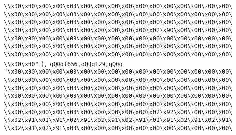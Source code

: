 \verb|\\x00\x00\x00\x00\x00\x00\x00\x00\x00\x00\x00\x00\x00\x00\x00\x00\|\newline
\verb|\\x00\x00\x00\x00\x00\x00\x00\x00\x00\x00\x00\x00\x00\x00\x00\x00\|\newline
\verb|\\x00\x00\x00\x00\x00\x00\x00\x00\x00\x00\x00\x00\x00\x00\x00\x00\|\newline
\verb|\\x00\x00\x00\x00\x00\x00\x00\x00\x00\x00\x02\x90\x00\x00\x00\x00\|\newline
\verb|\\x00\x00\x00\x00\x00\x00\x00\x00\x00\x00\x00\x00\x00\x00\x00\x00\|\newline
\verb|\\x00\x00\x00\x00\x00\x00\x00\x00\x00\x00\x00\x00\x00\x00\x00\x00\|\newline
\verb|\\x00\x00\x00\x00\x00\x00\x00\x00\x00\x00\x00\x00\x00\x00\x00\x00\|\newline
\verb|\\x00\x00"|\newline
\verb|),|\newline
\verb|qQQq(656,qQQq129,qQQq|\newline
\verb|"\x00\x00\x00\x00\x00\x00\x00\x00\x00\x00\x00\x00\x00\x00\x00\x00\|\newline
\verb|\\x00\x00\x00\x00\x00\x00\x00\x00\x00\x00\x00\x00\x00\x00\x00\x00\|\newline
\verb|\\x00\x00\x00\x00\x00\x00\x00\x00\x00\x00\x00\x00\x00\x00\x00\x00\|\newline
\verb|\\x00\x00\x00\x00\x00\x00\x00\x00\x00\x00\x00\x00\x00\x00\x00\x00\|\newline
\verb|\\x00\x00\x00\x00\x00\x00\x00\x00\x00\x00\x00\x00\x00\x00\x00\x00\|\newline
\verb|\\x00\x00\x00\x00\x00\x00\x00\x00\x00\x00\x02\x92\x00\x00\x00\x00\|\newline
\verb|\\x02\x91\x02\x91\x02\x91\x02\x91\x02\x91\x02\x91\x02\x91\x02\x91\|\newline
\verb|\\x02\x91\x02\x91\x00\x00\x00\x00\x00\x00\x00\x00\x00\x00\x00\x00\|\newline
